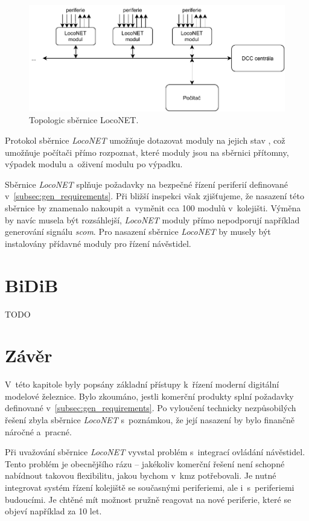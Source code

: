 \begin{figure}[ht!]
\includegraphics[width=\textwidth]{data/loconet.pdf}
\caption{Topologic sběrnice LocoNET.}
\label{fig:loconet-topology}
\end{figure}

Protokol sběrnice \textit{LocoNET} umožňuje dotazovat moduly na jejich stav
\cite{loconet-specs}, což umožňuje počítači přímo rozpoznat, které moduly jsou
na sběrnici přítomny, výpadek modulu a~oživení modulu po výpadku.

Sběrnice \textit{LocoNET} splňuje požadavky na bezpečné řízení periferií
definované v~\ref{subsec:gen_requirements}. Při bližší inspekci však
zjišťujeme, že nasazení této sběrnice by znamenalo nakoupit a~vyměnit cca 100
modulů v~kolejišti. Výměna by navíc musela být rozsáhlejší, \textit{LocoNET}
moduly přímo nepodporují například generování signálu \textit{\gls{scom}}. Pro
nasazení sběrnice \textit{LocoNET} by musely být instalovány přídavné moduly
pro řízení návěstidel.

\section{BiDiB}

TODO

\section{Závěr}

V~této kapitole byly popsány základní přístupy k~řízení moderní digitální
modelové železnice. Bylo zkoumáno, jestli komerční produkty splní požadavky
definované v~\ref{subsec:gen_requirements}. Po vyloučení technicky
nezpůsobilých řešení zbyla sběrnice \textit{LocoNET} s~poznámkou, že její
nasazení by bylo finančně náročné a~pracné.

Při uvažování sběrnice \textit{LocoNET} vyvstal problém s~integrací ovládání
návěstidel. Tento problém je obecnějšího rázu – jakékoliv komerční řešení není
schopné nabídnout takovou flexibilitu, jakou bychom v~\gls{kmz} potřebovali.
Je nutné integrovat systém řízení kolejiště se současnými periferiemi, ale
i~s~periferiemi budoucími. Je chtěné mít možnost pružně reagovat na nové
periferie, které se objeví například za 10 let.

